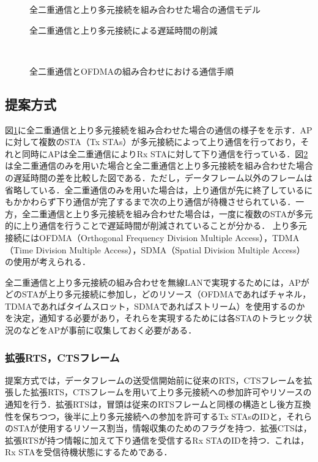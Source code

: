 \documentclass[technicalreport]{ieicej}
\begin{document}
	\begin{figure}
		\centering
		\caption{全二重通信と上り多元接続を組み合わせた場合の通信モデル}
		\label{fig:fdofdma-model}
	\end{figure}

	\begin{figure}[t]
		\centering
		\caption{全二重通信と上り多元接続による遅延時間の削減}
		\label{fig:delay}
	\end{figure}

	\begin{figure}[t]
		\centering
		\\
		\caption{全二重通信とOFDMAの組み合わせにおける通信手順}
		\label{fig:fdofdma-protocol}
	\end{figure}

	\subsection{提案方式\label{sec:pro_ofdma}}
	図\ref{fig:fdofdma-model}に全二重通信と上り多元接続を組み合わせた場合の通信の様子をを示す．APに対して複数のSTA（Tx STAs）が多元接続によって上り通信を行っており，それと同時にAPは全二重通信によりRx STAに対して下り通信を行っている．図\ref{fig:delay}は全二重通信のみを用いた場合と全二重通信と上り多元接続を組み合わせた場合の遅延時間の差を比較した図である．ただし，データフレーム以外のフレームは省略している．全二重通信のみを用いた場合は，上り通信が先に終了しているにもかかわらず下り通信が完了するまで次の上り通信が待機させられている．一方，全二重通信と上り多元接続を組み合わせた場合は，一度に複数のSTAが多元的に上り通信を行うことで遅延時間が削減されていることが分かる．
	上り多元接続にはOFDMA（Orthogonal Frequency Division Multiple Access），TDMA（Time Division Multiple Access），SDMA（Spatial Division Multiple Access）の使用が考えられる．
	\par
	全二重通信と上り多元接続の組み合わせを無線LANで実現するためには，APがどのSTAが上り多元接続に参加し，どのリソース（OFDMAであればチャネル，TDMAであればタイムスロット，SDMAであればストリーム）を使用するのかを決定，通知する必要があり，それらを実現するためには各STAのトラヒック状況のなどをAPが事前に収集しておく必要がある．
		\subsubsection{拡張RTS，CTSフレーム}
		提案方式では，データフレームの送受信開始前に従来のRTS，CTSフレームを拡張した拡張RTS，CTSフレームを用いて上り多元接続への参加許可やリソースの通知を行う．拡張RTSは，冒頭は従来のRTSフレームと同様の構造とし後方互換性を保ちつつ，後半に上り多元接続への参加を許可するTx STAsのIDと，それらのSTAが使用するリソース割当，情報収集のためのフラグを持つ．拡張CTSは，拡張RTSが持つ情報に加えて下り通信を受信するRx STAのIDを持つ．これは，Rx STAを受信待機状態にするためである．
\end{document}
